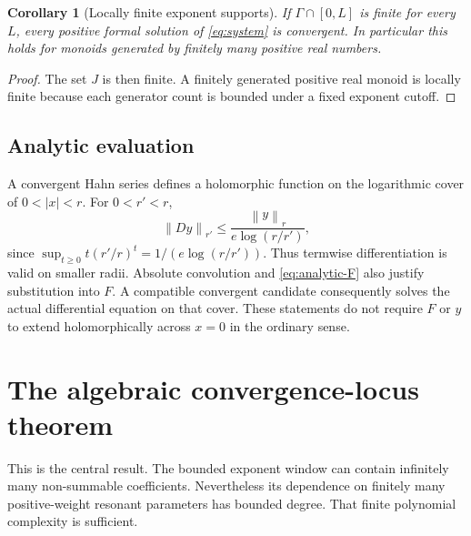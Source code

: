 \documentclass[11pt,a4paper]{article}
\numberwithin{equation}{section}
\newtheorem{corollary}[theorem]{Corollary}
\theoremstyle{definition}
\theoremstyle{remark}
\newcommand{\G}{\Gamma}
\newcommand{\norm}[1]{\left\lVert #1\right\rVert}
\begin{document}
\begin{corollary}[Locally finite exponent supports]\label{cor:locfinite}
If $\G\cap[0,L]$ is finite for every $L$, every positive formal solution
of \eqref{eq:system} is convergent. In particular this holds for monoids
generated by finitely many positive real numbers.
\end{corollary}
\begin{proof}
The set $J$ is then finite. A finitely generated positive real monoid is
locally finite because each generator count is bounded under a fixed
exponent cutoff.
\end{proof}

\subsection{Analytic evaluation}
A convergent Hahn series defines a holomorphic function on the logarithmic
cover of $0<|x|<r$. For $0<r'<r$,
\begin{equation}\label{eq:derivative-bound}
 \norm{Dy}_{r'}\leq
 \frac{\norm y_r}{e\log(r/r')},
\end{equation}
since $\sup_{t\geq0}t(r'/r)^t=1/(e\log(r/r'))$.
Thus termwise differentiation is valid on smaller radii. Absolute
convolution and \eqref{eq:analytic-F} also justify substitution into $F$.
A compatible convergent candidate consequently solves the actual
differential equation on that cover. These statements do not require
$F$ or $y$ to extend holomorphically across $x=0$ in the ordinary sense.

\section{The algebraic convergence-locus theorem}
\label{sec:algebraic}

This is the central result. The bounded exponent window can contain
infinitely many non-summable coefficients. Nevertheless its dependence
on finitely many positive-weight resonant parameters has bounded degree.
That finite polynomial complexity is sufficient.
\end{document}
